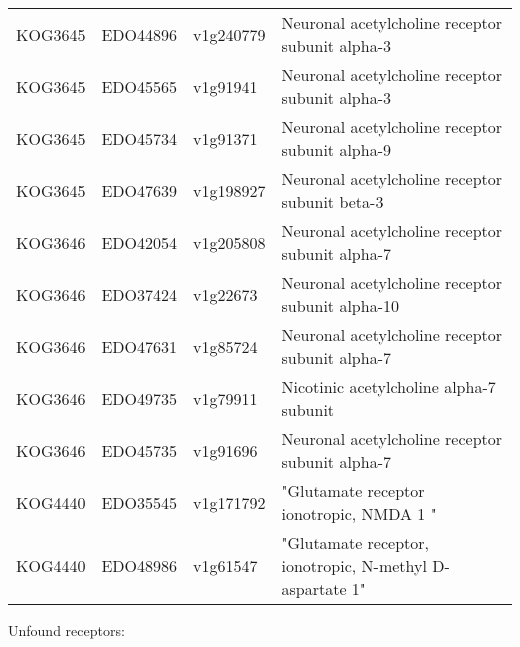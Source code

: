 \begin{longtable}[l]{lll>{\raggedright\arraybackslash}p{30em}}
KOG3645 & EDO44896 & v1g240779 & Neuronal acetylcholine receptor subunit alpha-3\\
\rowcolor{gray!6}  KOG3645 & EDO45565 & v1g91941 & Neuronal acetylcholine receptor subunit alpha-3\\
KOG3645 & EDO45734 & v1g91371 & Neuronal acetylcholine receptor subunit alpha-9\\
\rowcolor{gray!6}  KOG3645 & EDO47639 & v1g198927 & Neuronal acetylcholine receptor subunit beta-3\\
KOG3646 & EDO42054 & v1g205808 & Neuronal acetylcholine receptor subunit alpha-7\\
\rowcolor{gray!6}  KOG3646 & EDO37424 & v1g22673 & Neuronal acetylcholine receptor subunit alpha-10\\
KOG3646 & EDO47631 & v1g85724 & Neuronal acetylcholine receptor subunit alpha-7\\
\rowcolor{gray!6}  KOG3646 & EDO49735 & v1g79911 & Nicotinic acetylcholine alpha-7 subunit\\
KOG3646 & EDO45735 & v1g91696 & Neuronal acetylcholine receptor subunit alpha-7\\
\rowcolor{gray!6}  KOG4440 & EDO35545 & v1g171792 & "Glutamate receptor ionotropic, NMDA 1 "\\
KOG4440 & EDO48986 & v1g61547 & "Glutamate receptor, ionotropic, N-methyl D-aspartate 1"\\
\bottomrule
\end{longtable}

Unfound receptors:

